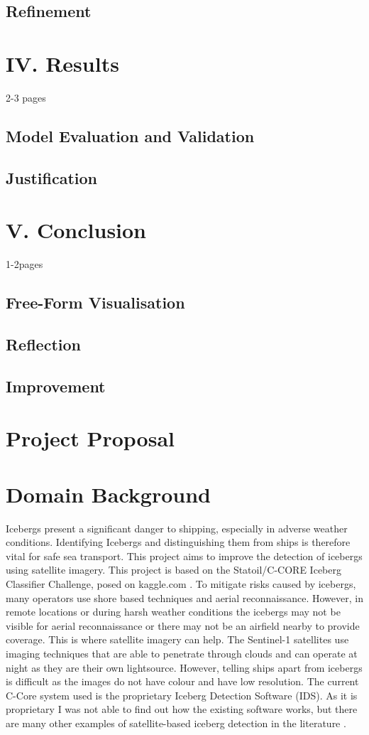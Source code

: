 \documentclass{article}
\begin{document}
\subsection{Refinement}

\section{IV. Results}
2-3 pages
\subsection{Model Evaluation and Validation}
\subsection{Justification}

\section{V. Conclusion}
1-2pages
\subsection{Free-Form Visualisation}
\subsection{Reflection}
\subsection{Improvement}



\newpage{}
\section{Project Proposal}
\section{Domain Background}
Icebergs present a significant danger to shipping, especially in adverse weather conditions. Identifying Icebergs and distinguishing them from ships is therefore vital for safe sea transport. This project aims to improve the detection of icebergs using satellite imagery. This project is based on the Statoil/C-CORE Iceberg Classifier Challenge, posed on kaggle.com \cite{kaggle}. To mitigate risks caused by icebergs, many operators use shore based techniques and aerial reconnaissance. However, in remote locations or during harsh weather conditions the icebergs may not be visible for aerial reconnaissance or there may not be an airfield nearby to provide coverage. This is where satellite imagery can help. The Sentinel-1 satellites use imaging techniques that are able to penetrate through clouds and can operate at night as they are their own lightsource. However, telling ships apart from icebergs is difficult as the images do not have colour and have low resolution. The current C-Core system used is the proprietary Iceberg Detection Software (IDS). As it is proprietary I was not able to find out how the existing software works, but there are many other examples of satellite-based iceberg detection in the literature  \cite{c-core,bentes}. 
\end{document}
